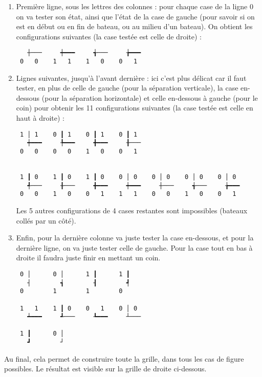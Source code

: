 \begin{enumerate}
\item Première ligne, sous les lettres des colonnes : pour chaque case de la ligne $0$ on va tester son état, ainsi que l'état de la case de gauche (pour savoir si on est en début ou en fin de bateau, ou au milieu d'un bateau). On obtient les configurations suivantes (la case testée est celle de droite) :

\begin{verbatim}
   ┼───     ┿━━━     ╅───     ╆━━━
 0   0    1   1    1   0    0   1
\end{verbatim}


\item Lignes suivantes, jusqu'à l'avant dernière : ici c'est plus délicat car il faut tester, en plus de celle de gauche (pour la séparation verticale), la case en-dessous (pour la séparation horizontale) et celle en-dessous à gauche (pour le coin) pour obtenir les 11 configurations suivantes (la case testée est celle en haut à droite) :

\begin{verbatim}
 1 │ 1    0 ┃ 1    0 ┃ 1    0 ┃ 1
   ┿━━━     ╄━━━     ╋━━━     ╂───
 0   0    0   0    1   0    0   1
  
 
 1 ┃ 0    1 ┃ 0    1 ┃ 0    0 │ 0    0 │ 0    0 │ 0    0 │ 0
   ╃───     ╂───     ╋━━━     ┿━━━     ┼───     ╅───     ╆━━━
 0   0    1   0    0   1    1   1    0   0    1   0    0   1
\end{verbatim}

Les 5 autres configurations de 4 cases restantes sont impossibles (bateaux collés par un côté).

\item Enfin, pour la dernière colonne va juste tester la case en-dessous, et pour la dernière ligne, on va juste tester celle de gauche. Pour la case tout en bas à droite il faudra juste finir en mettant un coin.

\begin{verbatim}
 0 │      0 │      1 ┃      1 ┃  
   ┤        ┪        ┨        ┩
 0        1        1        0
 
 1   1    1 ┃ 0    0   1    0 │ 0
   ┷━━━     ┹───     ┺━━━     ┴───

 1 ┃      0 │
   ┛        ┘
\end{verbatim}
\end{enumerate}

Au final, cela permet de construire toute la grille, dans tous les cas de figure possibles. Le résultat est visible sur la grille de droite ci-dessous.




